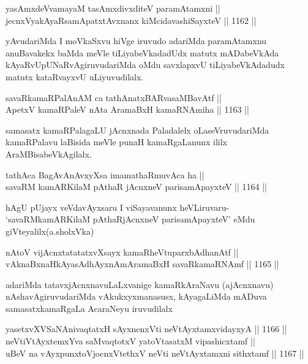 \begin{shl}
yasAmxdeVvamayaM tasAmxdivxditeV paramAtamxni || \\
jecnxVyakAyaRsamApatxtAvxnanx kiMcidavashiSayxteV ||  1162 ||  
\end{shl}

\begin{artha}
yAvudariMda I moVkaSxvu hiVge iruvudo adariMda paramAtamxnu anuBavakekx baMda meVle tiLiyabeVkadadUdx matutx mADabeVkAda kAyaRvUpUNaRvAgiruvudariMda  oMdu savxlapxvU tiLiyabeVkAdadudx matutx kataRvayxvU uLiyuvudilalx.
\end{artha}

\begin{shl}
savaRkamaRPalAnAM ca tathA\s natxBARvasaMBavAtf || \\
ApetxV kamaRPaleV nAta AramaBxH kamaRNAmiha ||  1163 ||  
\end{shl}

\begin{artha}
samasatx kamaRPalagaLU jAcnxnada Paladalelx oLaseVruvudariMda kamaRPalavu laBisida meVle punaH kamaRgaLanunx ililx AraMBisabeVkAgilalx.
\end{artha}

\begin{shl}
tathAca BagAvAnAvxyXsa imamathaRmuvAca ha || \\
savaRM kamARKilaM pAthaR jAcnxneV parisamApayxteV ||  1164 ||  
\end{shl}

\begin{artha}
hAgU pUjayx veVdavAyxsaru I viSayavanunx heVLiruvaru- `savaRMkamARKilaM pAthaRjAcnxneV parisamApayxteV' eMdu giVteyalilx(a.sholxVka)
\end{artha}

\begin{shl}
nAtoV vijAcnxtatatatxvXsayx kamaRheVtuparxbAdhanAtf || \\
vAknaBxnaHkAyasAdhAyxnAmAramaBxH savaRkamaRNAmf ||  1165 ||  
\end{shl}

\begin{artha}
adariMda tatavxjAcnxnavuLaLxvanige kamaRkAraNavu (ajAcnxnavu) nAshavAgiruvudariMda vAkukxyxmanasusx, kAyagaLiMda mADuva samasatxkamaRgaLa AcaraNeyu iruvudilalx
\end{artha}

\begin{shl}
yasetxvXVSaNAnivaqtatxH sAyxnenxVti neVtAyxtamxvidayxyA ||  1166 ||  \\
neVtiVtAyxtemxYva saMvaqtotxV yatoV\s tasatxM vipashicxtamf ||  \\
uBeV na vAyxpunxtoV\s jocnxVtethxV neVti neVtAyxtamxni sithxtamf ||  1167 ||  
\end{shl}

